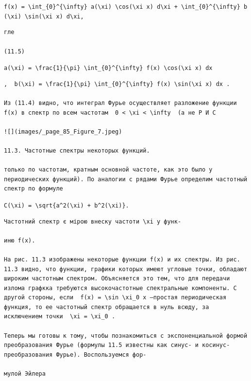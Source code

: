 \documentclass[
  ukrainian,
]{article}
\begin{document}
\texttt{f(x)\ =\ \textbackslash{}int\_\{0\}\^{}\{\textbackslash{}infty\}\ a(\textbackslash{}xi)\ \textbackslash{}cos(\textbackslash{}xi\ x)\ d\textbackslash{}xi\ +\ \textbackslash{}int\_\{0\}\^{}\{\textbackslash{}infty\}\ b(\textbackslash{}xi)\ \textbackslash{}sin(\textbackslash{}xi\ x)\ d\textbackslash{}xi,}

\begin{verbatim}
гле

(11.5)
\end{verbatim}

\texttt{a(\textbackslash{}xi)\ =\ \textbackslash{}frac\{1\}\{\textbackslash{}pi\}\ \textbackslash{}int\_\{0\}\^{}\{\textbackslash{}infty\}\ f(x)\ \textbackslash{}cos(\textbackslash{}xi\ x)\ dx}

\begin{verbatim}
,  b(\xi) = \frac{1}{\pi} \int_{0}^{\infty} f(x) \sin(\xi x) dx .

Из (11.4) видно, что интеграл Фурье осуществляет разложение функции f(x) в спектр по всем частотам  0 < \xi < \infty  (а не Р И С

![](images/_page_85_Figure_7.jpeg)

11.3. Частотные спектры некоторых функций.

только по частотам, кратным основной частоте, как это было у периодических функций). По аналогии с рядами Фурье определим частотный спектр по формуле
\end{verbatim}

\texttt{C(\textbackslash{}xi)\ =\ \textbackslash{}sqrt\{a\^{}2(\textbackslash{}xi)\ +\ b\^{}2(\textbackslash{}xi)\}.}

\begin{verbatim}
Частотний спектр є мірою внеску частоти \xi у функ-

иню f(x).

На рис. 11.3 изображены некоторые функции f(x) и их спектры. Из рис. 11.3 видно, что функции, графики которых имеют угловые точки, обладают широким частотным спектром. Объясняется это тем, что для передачи излома графкка требуются высокочастотные спектральные компоненты. С другой стороны, если  f(x) = \sin \xi_0 x —простая периодическая функция, то ее частотный спектр обращается в нуль всюду, за исключением точки  \xi = \xi_0 .

Теперь мы готовы к тому, чтобы познакомиться с экспоненциальной формой преобразования Фурье (формулы 11.5 известны как синус- и косинус-преобразования Фурье). Воспользуемся фор-

мулой Эйлера
\end{verbatim}
\end{document}
